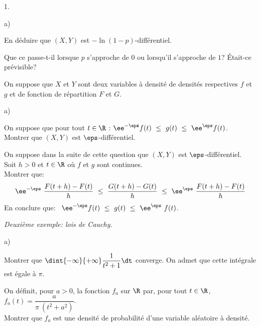 \documentclass[11pt]{article}%
\begin{document}
\begin{noliste}{1.}
\begin{noliste}{a)}
    
    
    
    

  \item En déduire que $(X,Y)$ est $-\ln(1-p)$-différentiel.

    

  \item Que ce passe-t-il lorsque $p$ s'approche de $0$ ou lorsqu'il
    s'approche de $1$? Était-ce prévisible?

    
  \end{noliste}
  
\item On suppose que $X$ et $Y$ sont deux variables à densité de
  densités respectives $f$ et $g$ et de fonction de répartition $F$ et
  $G$.
  \begin{noliste}{a)}
    \setlength{\itemsep}{2mm} %
  \item On suppose que pour tout $t\in\R$ : $\ee^{-\eps} f(t) \ \leq \
    g(t) \ \leq \ \ee^{\eps}f(t)$.\\
    Montrer que $(X,Y)$ est $\eps$-différentiel.

    

  \item On suppose dans la suite de cette question que $(X,Y)$ est
    $\eps$-différentiel.\\
    Soit $h>0$ et $t \in \R$ où $f$ et $g$ sont continues.\\[.2cm]
    Montrer que:
    \[
    \ee^{-\eps} \ \dfrac{F(t+h)-F(t)}{h} \ \leq \
    \dfrac{G(t+h)-G(t)}{h} \ \leq \ \ee^{\eps} \
    \dfrac{F(t+h)-F(t)}{h}
    \]
    En conclure que: \ $\ee^{-\eps} f(t) \ \leq \ g(t) \ \leq \
    \ee^{\eps} \ f(t)$.

    

  \end{noliste}
  
\item {\em Deuxième exemple: lois de Cauchy.}
  \begin{noliste}{a)}
    \setlength{\itemsep}{2mm} %
  \item Montrer que $\dint{-\infty}{+\infty} \dfrac{1}{t^2+1} \dt$
    converge. On admet que cette intégrale est égale à $\pi$.

    
    
    
    
    

  \item On définit, pour $a > 0$, la fonction $f_a$ sur $\R$ par, pour
    tout $t \in \R$, $f_a(t) = \dfrac{a}{\pi \ (t^2+a^2)}$.\\
    Montrer que $f_a$ est une densité de probabilité d'une variable
    aléatoire à densité.


\end{noliste}
\end{noliste}
\end{document}
